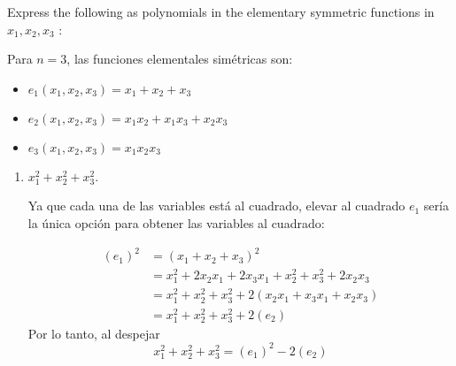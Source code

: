 \begin{problema}[Problema 8]
    Express the following as polynomials in the elementary symmetric functions in $x_1, x_2, x_3$ :

    \begin{cajita}
        Para $n=3$, las funciones elementales simétricas son: 
        \begin{itemize}
            \item $e_1(x_1,x_2,x_3)=x_1+x_2+x_3$
            \item $e_2(x_1,x_2,x_3)=x_1x_2+x_1x_3+x_2x_3$
            \item $e_3(x_1,x_2,x_3)=x_1x_2x_3$
        \end{itemize}
    \end{cajita}
    \begin{enumerate}
        \item $x_1^2+x_2^2+x_3^2$.
        \begin{sol}
            Ya que cada una de las variables está al cuadrado, elevar al cuadrado $e_1$ sería la única opción para obtener las variables al cuadrado: 

            \begin{align*}
                (e_1)^2&= (x_1+x_2+x_3)^2\\
                       &= x_1^2+2x_2x_1+2x_3x_1+x_2^2+x_3^2+2x_2x_3\\
                       &= x_1^2+x_2^2+x_3^2+ 2(x_2x_1+x_3x_1+x_2x_3)\\
                       &= x_1^2+x_2^2+x_3^2+ 2(e_2)
            \end{align*}
            Por lo tanto, al despejar
            $$x_1^2+x_2^2+x_3^2 = (e_1)^2-2(e_2)$$
        

\end{sol}
\end{enumerate}
\end{problema}

